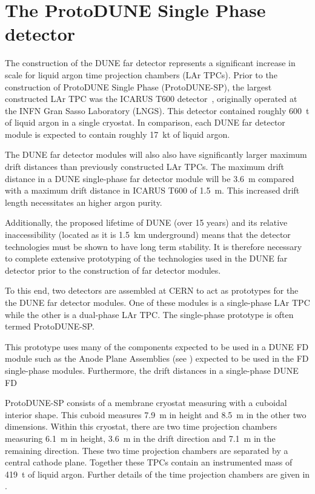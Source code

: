 \chapter{The ProtoDUNE Single Phase detector}
\label{sec:protodune}

The construction of the DUNE far detector represents a significant increase in scale for liquid argon time projection chambers (LAr TPCs).
Prior to the construction of ProtoDUNE Single Phase (ProtoDUNE-SP), the largest constructed LAr TPC was the ICARUS T600 detector~\cite{icarus}, originally operated at the INFN Gran Sasso Laboratory (LNGS).
This detector contained roughly \SI{600}{\tonne} of liquid argon in a single cryostat.
In comparison, each DUNE far detector module is expected to contain roughly \SI{17}{\kilo\tonne} of liquid argon.

The DUNE far detector modules will also also have significantly larger maximum drift distances than previously constructed LAr TPCs.
The maximum drift distance in a DUNE single-phase far detector module will be \SI{3.6}{\m} compared with a maximum drift distance in ICARUS T600 of \SI{1.5}{\m}.
This increased drift length necessitates an higher argon purity.

Additionally, the proposed lifetime of DUNE (over 15 years) and its relative inaccessibility (located as it is \SI{1.5}{\kilo\metre} underground) means that the detector technologies must be shown to have long term stability.
It is therefore necessary to complete extensive prototyping of the technologies used in the DUNE far detector prior to the construction of far detector modules.

To this end, two detectors are assembled at CERN to act as prototypes for the the DUNE far detector modules.
One of these modules is a single-phase LAr TPC while the other is a dual-phase LAr TPC.
The single-phase prototype is often termed ProtoDUNE-SP.

This prototype uses many of the components expected to be used in a DUNE FD module such as the Anode Plane Assemblies (see ) expected to be used in the FD single-phase modules.
Furthermore, the drift distances in a single-phase DUNE FD

ProtoDUNE-SP consists of a membrane cryostat measuring with a cuboidal interior shape.
This cuboid measures \SI{7.9}{\m} in height and \SI{8.5}{\m} in the other two dimensions.
Within this cryostat, there are two time projection chambers measuring \SI{6.1}{\m} in height, \SI{3.6}{\m} in the drift direction and \SI{7.1}{\m} in the remaining direction.
These two time projection chambers are separated by a central cathode plane.
Together these TPCs contain an instrumented mass of \SI{419}{\tonne} of liquid argon.
Further details of the time projection chambers are given in .

